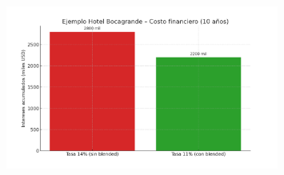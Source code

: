\begin{figure}[H]
    \centering
    \includegraphics[width=0.8\textwidth]{Appendix/4.png}\label{fig:anexo4}
    \caption{}
\end{figure}